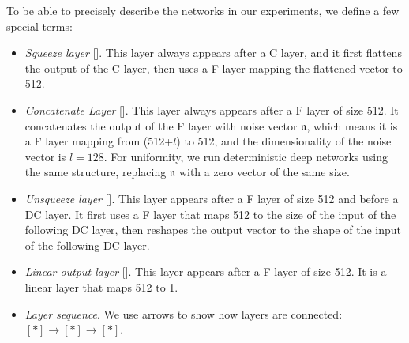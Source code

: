 \documentclass[letterpaper]{article} %
\begin{document}
To be able to precisely describe the networks in our experiments,  we define a few special terms:
\begin{itemize}
    \item \textit{Squeeze layer} []. This layer always appears after a C layer, and it first flattens the output of the C layer, then uses a F layer mapping the flattened vector to 512.
    \item \textit{Concatenate Layer} []. This layer always appears after a F layer of size 512. It concatenates the output of the F layer with noise vector $\mathfrak{n}$, which means it is a F layer mapping from (512+$l$) to 512, and the dimensionality of the noise vector is $l=128$. For uniformity, we run deterministic deep networks using the same structure, replacing $\mathfrak{n}$ with a zero vector of the same size.
    \item \textit{Unsqueeze layer} []. This layer appears after a F layer of size 512 and before a DC layer. It first uses a F layer that maps 512 to the size of the input of the following DC layer, then reshapes the output vector to the shape of the input of the following DC layer.
    \item \textit{Linear output layer} []. This layer appears after a F layer of size 512. It is a linear layer that maps 512 to 1.
    \item \textit{Layer sequence}. We use arrows to show how layers are connected: $[\ast]\rightarrow[\ast]\rightarrow[\ast]$.
\end{itemize}
\end{document}
